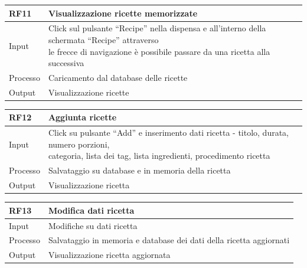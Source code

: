 \documentclass{article}
\begin{document}
\begin{table}[H]
    \begin{flushleft}
      \begin{tabular}{l|l}
        \toprule
        \textbf{RF11} & \textbf{Visualizzazione ricette memorizzate}\\
        \midrule
        Input & \makecell{Click sul pulsante “Recipe” nella dispensa e all’interno della schermata “Recipe” attraverso \\ le frecce di navigazione è possibile passare da una ricetta alla successiva}\\
        Processo & Caricamento dal database delle ricette\\
        Output & Visualizzazione ricette\\
        \bottomrule
      \end{tabular}
    \end{flushleft}
\end{table}

\begin{table}[H]
    \begin{flushleft}
      \begin{tabular}{l|l}
        \toprule
        \textbf{RF12} & \textbf{Aggiunta ricette}\\
        \midrule
        Input & \makecell{Click su pulsante “Add” e inserimento dati ricetta - titolo, durata, numero porzioni, \\ categoria, lista dei tag, lista ingredienti, procedimento ricetta}\\
        Processo & Salvataggio su database e in memoria della ricetta\\
        Output & Visualizzazione ricetta\\
        \bottomrule
      \end{tabular}
    \end{flushleft}
\end{table}

\begin{table}[H]
    \begin{flushleft}
      \begin{tabular}{l|l}
        \toprule
        \textbf{RF13} & \textbf{Modifica dati ricetta}\\
        \midrule
        Input & Modifiche su dati ricetta\\
        Processo & Salvataggio in memoria e database dei dati della ricetta aggiornati\\
        Output & Visualizzazione ricetta aggiornata\\
        \bottomrule
      \end{tabular}
    \end{flushleft}
\end{table}
\end{document}
